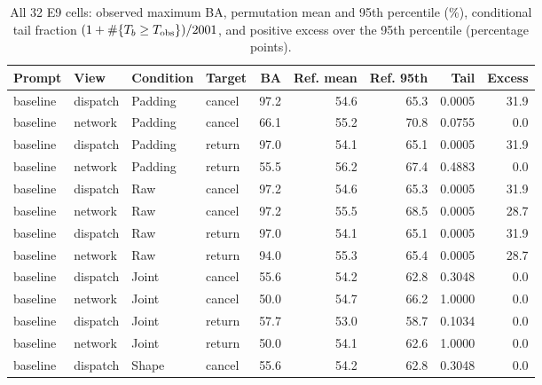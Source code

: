 \begin{table}[ht]\centering\footnotesize

\caption{All 32 E9 cells: observed maximum BA, permutation mean and 95th percentile (\%), conditional tail fraction $(1+\#\{T_b\ge T_{\rm obs}\})/2001$, and positive excess over the 95th percentile (percentage points).}

\begin{tabular}{@{}llllrrrrr@{}}\toprule

Prompt & View & Condition & Target & BA & Ref. mean & Ref. 95th & Tail & Excess\\\midrule

baseline & dispatch & Padding & cancel & 97.2 & 54.6 & 65.3 & 0.0005 & 31.9\\

baseline & network & Padding & cancel & 66.1 & 55.2 & 70.8 & 0.0755 & 0.0\\

baseline & dispatch & Padding & return & 97.0 & 54.1 & 65.1 & 0.0005 & 31.9\\

baseline & network & Padding & return & 55.5 & 56.2 & 67.4 & 0.4883 & 0.0\\

baseline & dispatch & Raw & cancel & 97.2 & 54.6 & 65.3 & 0.0005 & 31.9\\

baseline & network & Raw & cancel & 97.2 & 55.5 & 68.5 & 0.0005 & 28.7\\

baseline & dispatch & Raw & return & 97.0 & 54.1 & 65.1 & 0.0005 & 31.9\\

baseline & network & Raw & return & 94.0 & 55.3 & 65.4 & 0.0005 & 28.7\\

baseline & dispatch & Joint & cancel & 55.6 & 54.2 & 62.8 & 0.3048 & 0.0\\

baseline & network & Joint & cancel & 50.0 & 54.7 & 66.2 & 1.0000 & 0.0\\

baseline & dispatch & Joint & return & 57.7 & 53.0 & 58.7 & 0.1034 & 0.0\\

baseline & network & Joint & return & 50.0 & 54.1 & 62.6 & 1.0000 & 0.0\\

baseline & dispatch & Shape & cancel & 55.6 & 54.2 & 62.8 & 0.3048 & 0.0\\


\end{tabular}
\end{table}
